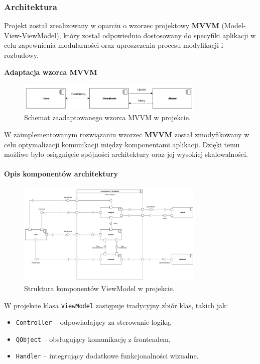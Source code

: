 \subsubsection{Architektura}
Projekt został zrealizowany w oparciu o wzorzec projektowy \textbf{MVVM} (Model-View-ViewModel), który został odpowiednio dostosowany do specyfiki aplikacji w celu zapewnienia modularności oraz uproszczenia procesu modyfikacji i rozbudowy.

\textbf{Adaptacja wzorca MVVM}
\begin{figure}[h!]
    \centering
    \includegraphics[width=0.8\textwidth]{img/diagramy/architektura.png}
    \caption{Schemat zaadaptowanego wzorca MVVM w projekcie.}
\end{figure}

W zaimplementowanym rozwiązaniu wzorzec \textbf{MVVM} został zmodyfikowany w celu optymalizacji komunikacji między komponentami aplikacji. Dzięki temu możliwe było osiągnięcie spójności architektury oraz jej wysokiej skalowalności.

\paragraph{Opis komponentów architektury}
\begin{figure}[h!]
    \centering
    \includegraphics[width=0.8\textwidth]{img/diagramy/diagram_komp_vm.png}
    \caption{Struktura komponentów ViewModel w projekcie.}
\end{figure}

W projekcie klasa \texttt{ViewModel} zastępuje tradycyjny zbiór klas, takich jak:
\begin{itemize}
    \item \texttt{Controller} -- odpowiadający za sterowanie logiką,
    \item \texttt{QObject} -- obsługujący komunikację z frontendem,
    \item \texttt{Handler} -- integrujący dodatkowe funkcjonalności wizualne.
\end{itemize}

